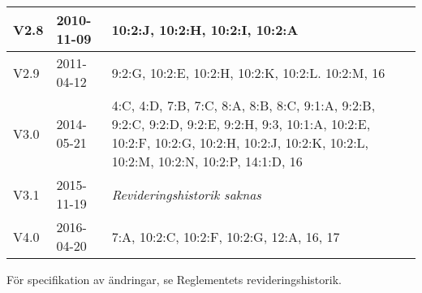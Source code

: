 \documentclass[10pt]{article}
\begin{document}
\begin{center}
\begin{tabular}{| l | l | p{10cm} |}
    \hline
    V2.8 & 2010-11-09 & 10:2:J, 10:2:H, 10:2:I, 10:2:A\\
    \hline
    V2.9 & 2011-04-12 & 9:2:G, 10:2:E, 10:2:H, 10:2:K, 10:2:L. 10:2:M, 16 \\
    \hline
    V3.0 & 2014-05-21 &  4:C, 4:D, 7:B, 7:C, 8:A, 8:B, 8:C, 9:1:A, 9:2:B, 9:2:C, 9:2:D, 9:2:E, 9:2:H, 9:3, 10:1:A, 10:2:E, 10:2:F, 10:2:G, 10:2:H, 10:2:J, 10:2:K, 10:2:L, 10:2:M, 10:2:N, 10:2:P, 14:1:D, 16\\
    \hline
    V3.1 & 2015-11-19 & \emph{Revideringshistorik saknas} \\
    \hline
    V4.0 & 2016-04-20 & 7:A, 10:2:C, 10:2:F, 10:2:G, 12:A, 16, 17 \\
    \hline
\end{tabular}
\end{center}
För specifikation av ändringar, se Reglementets revideringshistorik.
\end{document}
